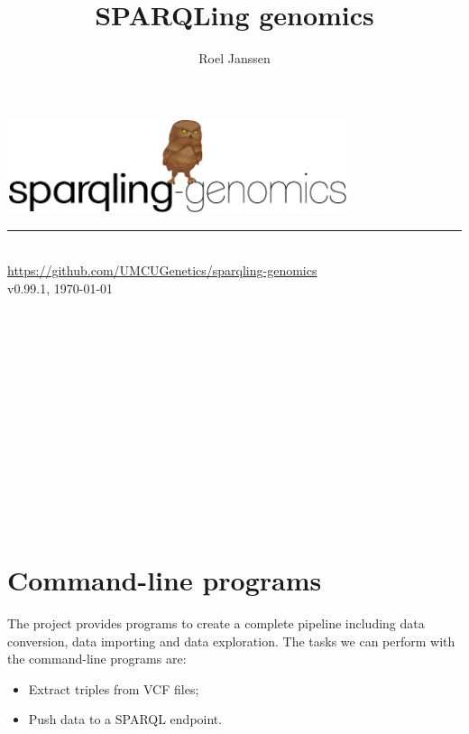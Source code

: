 \documentclass[11pt,a4paper,oneside]{book}
\title{SPARQLing genomics}
\author{Roel Janssen}
\begin{document}
\begin{titlepage}
  \vspace*{\fill}
  \begin{center}
    \includegraphics[width=0.75\textwidth]{figures/logo.pdf}
    \rule{0.75\textwidth}{1.0pt}~\\
    \url{https://github.com/UMCUGenetics/sparqling-genomics}~\\
    \large v0.99.1, \today{}
    ~\\~\\~\\~\\~\\~\\~\\~\\~\\~\\~\\~\\~\\~\\
  \end{center}
  \vspace*{\fill}

  \thispagestyle{empty}
\end{titlepage}

\setcounter{page}{1}
\hypersetup{linkcolor=black}
\tableofcontents
\newpage{}
\hypersetup{linkcolor=LinkGray}
\setcounter{page}{1}



\chapter{Command-line programs}

  The project provides programs to create a complete pipeline including
  data conversion, data importing and data exploration.  The tasks we can
  perform with the command-line programs are:
  \begin{itemize}
    \item Extract triples from VCF files;
    \item Push data to a SPARQL endpoint.
  \end{itemize}
\end{document}
